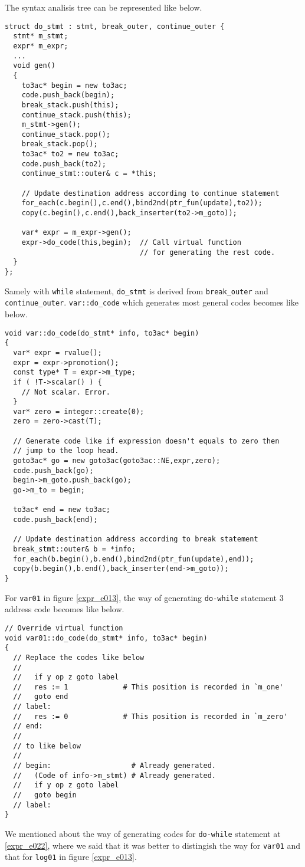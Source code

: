 The syntax analisis tree can be represented like below.
\begin{verbatim}
struct do_stmt : stmt, break_outer, continue_outer {
  stmt* m_stmt;
  expr* m_expr;
  ...
  void gen()
  {
    to3ac* begin = new to3ac;
    code.push_back(begin);
    break_stack.push(this);
    continue_stack.push(this);
    m_stmt->gen();
    continue_stack.pop();
    break_stack.pop();
    to3ac* to2 = new to3ac;
    code.push_back(to2);
    continue_stmt::outer& c = *this;

    // Update destination address according to continue statement
    for_each(c.begin(),c.end(),bind2nd(ptr_fun(update),to2));
    copy(c.begin(),c.end(),back_inserter(to2->m_goto));

    var* expr = m_expr->gen();
    expr->do_code(this,begin);  // Call virtual function
                                // for generating the rest code.
  }
};
\end{verbatim}
Samely with {\tt{while}} statement, {\tt{do\_stmt}} is
derived from {\tt{break\_outer}} and {\tt{continue\_outer}}.
{\tt{var::do\_code}} which generates most general codes
becomes like below.
\begin{verbatim}
void var::do_code(do_stmt* info, to3ac* begin)
{
  var* expr = rvalue();
  expr = expr->promotion();
  const type* T = expr->m_type;
  if ( !T->scalar() ) {
    // Not scalar. Error.
  }
  var* zero = integer::create(0);
  zero = zero->cast(T);

  // Generate code like if expression doesn't equals to zero then
  // jump to the loop head.
  goto3ac* go = new goto3ac(goto3ac::NE,expr,zero);
  code.push_back(go);
  begin->m_goto.push_back(go);
  go->m_to = begin;

  to3ac* end = new to3ac;
  code.push_back(end);

  // Update destination address according to break statement
  break_stmt::outer& b = *info;
  for_each(b.begin(),b.end(),bind2nd(ptr_fun(update),end));
  copy(b.begin(),b.end(),back_inserter(end->m_goto));
}
\end{verbatim}
For {\tt{var01}} in figure \ref{expr_e013},
the way of generating {\tt{do-while}} statement 3 address code
becomes like below.
\begin{verbatim}
// Override virtual function
void var01::do_code(do_stmt* info, to3ac* begin)
{
  // Replace the codes like below
  //
  //   if y op z goto label
  //   res := 1             # This position is recorded in `m_one'
  //   goto end
  // label:
  //   res := 0             # This position is recorded in `m_zero'
  // end:
  //
  // to like below
  //
  // begin:                   # Already generated.
  //   (Code of info->m_stmt) # Already generated.
  //   if y op z goto label
  //   goto begin
  // label:
}
\end{verbatim}
We mentioned about the way of generating codes for
{\tt{do-while}} statement at \ref{expr_e022}, where
we said that it was better to distingish 
the way for {\tt{var01}} and that for {\tt{log01}} in
figure \ref{expr_e013}.

